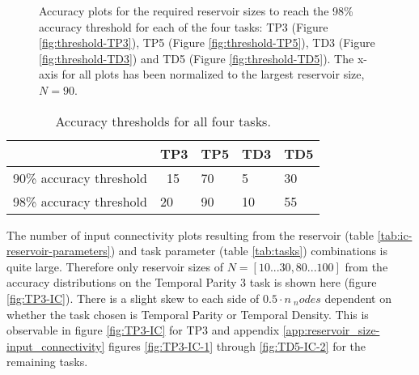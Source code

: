 \begin{figure}[ht]
    \centering
    \caption{
        Accuracy plots for the required reservoir sizes to reach the 98\% accuracy threshold for each of the four tasks:
        TP3 (Figure \ref{fig:threshold-TP3}), TP5 (Figure \ref{fig:threshold-TP5}), TD3 (Figure \ref{fig:threshold-TD3}) and TD5 (Figure \ref{fig:threshold-TD5}).
        The x-axis for all plots has been normalized to the largest reservoir size, $N=90$.
    }
    \label{fig:accuracy-threshold-size}
    \resizebox{\textwidth}{!}{
        \subfloat[TP3, N=20]{
            
            \label{fig:threshold-TP3}
        }
        \subfloat[TP5, N=90]{
            
            \label{fig:threshold-TP5}
        }
    }
    \resizebox{\textwidth}{!}{
        \subfloat[TD3, N=10]{
            
            \label{fig:threshold-TD3}
        }
        \subfloat[TD5, N=55]{
            
            \label{fig:threshold-TD5}
        }
    }
\end{figure}

\begin{table}[ht]
    \centering
    \caption{Accuracy thresholds for all four tasks.}
    \label{tab:accuracy-thresholds}
    \begin{tabular}{lllll}
    \hline
    \hline
                            & \textbf{TP3} & \textbf{TP5} & \textbf{TD3} & \textbf{TD5} \\
    \hline
    90\% accuracy threshold & ~15 & 70  & 5   & 30  \\
    98\% accuracy threshold & 20  & 90  & 10  & 55  \\
    \hline
    \end{tabular}
\end{table}

The number of input connectivity plots resulting from the reservoir (table \ref{tab:ic-reservoir-parameters}) and task parameter (table \ref{tab:tasks}) combinations is quite large.
Therefore only reservoir sizes of $ N=[10...30, 80...100]$ from the accuracy distributions on the Temporal Parity 3 task is shown here (figure \ref{fig:TP3-IC}).
There is a slight skew to each side of $ 0.5 \cdot n\ _nodes $ dependent on whether the task chosen is Temporal Parity or Temporal Density.
This is observable in figure \ref{fig:TP3-IC} for TP3 and appendix \ref{app:reservoir_size-input_connectivity} figures \ref{fig:TP3-IC-1} through \ref{fig:TD5-IC-2} for the remaining tasks.

